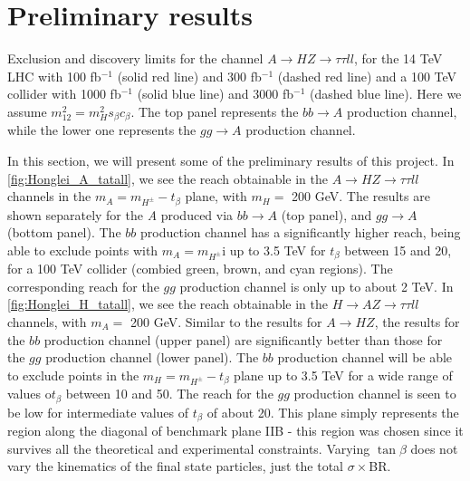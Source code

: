 {\section{Preliminary results}\label{sec:exo_higgs_results}
\begin{marginfigure}
\centering
  \caption{Exclusion and discovery limits for the channel $A\rightarrow HZ\rightarrow \tau\tau ll$, for the 14 TeV LHC with 100 fb$^{-1}$ (solid red line) and 300 fb$^{-1}$ (dashed red line) and a 100 TeV collider with 1000 fb$^{-1}$ (solid blue line) and 3000 fb$^{-1}$ (dashed blue line). Here we assume $m_{12}^2 = m_H^2s_\beta c_\beta$. The top panel represents the $bb\rightarrow A$ production channel, while the lower one represents the $gg\rightarrow A$ production channel. }
\label{fig:Honglei_A_tatall}
\end{marginfigure}
In this section, we will present some of the preliminary results of this project. In \autoref{fig:Honglei_A_tatall}, we see the reach obtainable in the $A\rightarrow HZ\rightarrow \tau\tau ll$ channels in the $m_A = m_{H^\pm} - t_\beta$ plane, with $m_H = $ 200 GeV. The results are shown separately for the \emph{A} produced via $bb\rightarrow A$ (top panel), and $gg\rightarrow A$ (bottom panel). The $bb$ production channel has a significantly higher reach, being able to exclude points with $m_A = m_{H^\pm}$i up to 3.5 TeV for $t_\beta$ between 15 and 20, for a 100 TeV collider (combied green, brown, and cyan regions). The corresponding reach for the $gg$ production channel is only up to about 2 TeV. In \autoref{fig:Honglei_H_tatall}, we see the reach obtainable in the $H\rightarrow AZ\rightarrow \tau\tau ll$ channels, with $m_A =$ 200 GeV. Similar to the results for $A\rightarrow HZ$, the results for the $bb$ production channel (upper panel) are significantly better than those for the $gg$ production channel (lower panel). The $bb$ production channel will be able to exclude points in the $m_H = m_{H^\pm} - t_\beta$ plane up to 3.5 TeV for a wide range of values o$t_\beta$ between 10 and 50. The reach for the $gg$ production channel is seen to be low for intermediate values of $t_\beta$ of about 20. This plane simply represents the region along the diagonal of benchmark plane IIB - this region was chosen since it survives all the theoretical and experimental constraints. Varying $\tan\beta$ does not vary the kinematics of the final state particles, just the total $\sigma\times$BR. 
}
